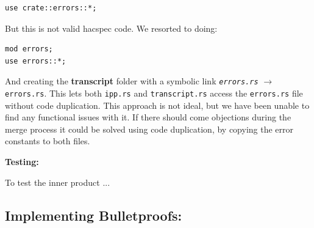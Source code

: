 \documentclass{article}
\begin{document}
\begin{lstlisting}
use crate::errors::*;
\end{lstlisting}

But this is not valid hacspec code. We resorted to doing:

\begin{lstlisting}
mod errors;
use errors::*;
\end{lstlisting}

And creating the \textbf{transcript} folder with a symbolic link
\texttt{\textit{errors.rs}} $\rightarrow$ \texttt{errors.rs}. This
lets both \texttt{ipp.rs} and \texttt{transcript.rs} access the
\texttt{errors.rs} file without code duplication. This approach is not
ideal, but we have been unable to find any functional issues with it. If
there should come objections during the merge process it could be solved
using code duplication, by copying the error constants to both files.

\textbf{Testing:}

To test the inner product 
...

\subsection{Implementing Bulletproofs:}
\end{document}
